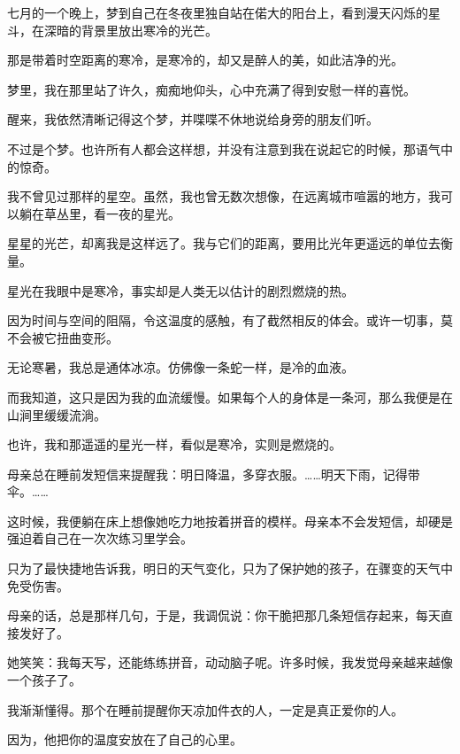 \documentclass[12pt,a4paper]{article}
\def\blankrev{\vspace{1ex}}									%
\begin{document}
		\blankrev
		七月的一个晚上，梦到自己在冬夜里独自站在偌大的阳台上，看到漫天闪烁的星斗，在深暗的背景里放出寒冷的光芒。\par
		那是带着时空距离的寒冷，是寒冷的，却又是醉人的美，如此洁净的光。\par
		梦里，我在那里站了许久，痴痴地仰头，心中充满了得到安慰一样的喜悦。\par
		醒来，我依然清晰记得这个梦，并喋喋不休地说给身旁的朋友们听。\par
		不过是个梦。也许所有人都会这样想，并没有注意到我在说起它的时候，那语气中的惊奇。\par
		我不曾见过那样的星空。虽然，我也曾无数次想像，在远离城市喧嚣的地方，我可以躺在草丛里，看一夜的星光。\par
		星星的光芒，却离我是这样远了。我与它们的距离，要用比光年更遥远的单位去衡量。\par
		星光在我眼中是寒冷，事实却是人类无以估计的剧烈燃烧的热。\par
		因为时间与空间的阻隔，令这温度的感触，有了截然相反的体会。或许一切事，莫不会被它扭曲变形。

		\blankrev
		无论寒暑，我总是通体冰凉。仿佛像一条蛇一样，是冷的血液。\par
		而我知道，这只是因为我的血流缓慢。如果每个人的身体是一条河，那么我便是在山涧里缓缓流淌。\par
		也许，我和那遥遥的星光一样，看似是寒冷，实则是燃烧的。

		\blankrev
		母亲总在睡前发短信来提醒我：明日降温，多穿衣服。……明天下雨，记得带伞。……\par
		这时候，我便躺在床上想像她吃力地按着拼音的模样。母亲本不会发短信，却硬是强迫着自己在一次次练习里学会。\par
		只为了最快捷地告诉我，明日的天气变化，只为了保护她的孩子，在骤变的天气中免受伤害。\par
		母亲的话，总是那样几句，于是，我调侃说：你干脆把那几条短信存起来，每天直接发好了。\par
		她笑笑：我每天写，还能练练拼音，动动脑子呢。许多时候，我发觉母亲越来越像一个孩子了。

		\blankrev
		我渐渐懂得。那个在睡前提醒你天凉加件衣的人，一定是真正爱你的人。\par
		因为，他把你的温度安放在了自己的心里。

	\endwriting


\end{document}
